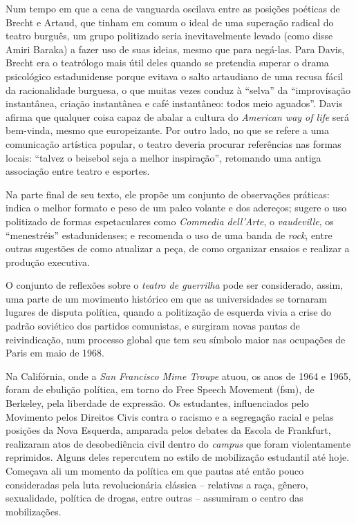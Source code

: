 Num tempo em que a cena de vanguarda oscilava entre as posições poéticas
de Brecht e Artaud, que tinham em comum o ideal de uma superação radical
do teatro burguês, um grupo politizado seria inevitavelmente levado
(como disse Amiri Baraka) a fazer uso de suas ideias, mesmo que para
negá-las. Para Davis, Brecht era o teatrólogo mais útil deles quando se
pretendia superar o drama psicológico estadunidense porque evitava o
salto artaudiano de uma recusa fácil da racionalidade burguesa, o que
muitas vezes conduz à “selva” da “improvisação instantânea, criação
instantânea e café instantâneo: todos meio aguados”. Davis afirma que
qualquer coisa capaz de abalar a cultura do {\it American way of life}
será bem-vinda, mesmo que europeizante. Por outro lado, no que se refere
a uma comunicação artística popular, o teatro deveria procurar
referências nas formas locais: “talvez o beisebol seja a melhor
inspiração”, retomando uma antiga associação entre teatro e esportes.

Na parte final de seu texto, ele propõe um conjunto de observações
práticas: indica o melhor formato e peso de um palco volante e dos
adereços; sugere o uso politizado de formas espetaculares como
{\it Commedia dell'Arte}, o {\it vaudeville}, os “menestréis”
estadunidenses; e recomenda o uso de uma banda de {\it rock}, entre
outras sugestões de como atualizar a peça, de como organizar ensaios e
realizar a produção executiva.

O conjunto de reflexões sobre o {\it teatro de guerrilha} pode ser
considerado, assim, uma parte de um movimento histórico em que as
universidades se tornaram lugares de disputa política, quando a
politização de esquerda vivia a crise do padrão soviético dos partidos
comunistas, e surgiram novas pautas de reivindicação, num processo
global que tem seu símbolo maior nas ocupações de Paris em maio de 1968.

Na Califórnia, onde a {\it San Francisco Mime Troupe} atuou, os anos de
1964 e 1965, foram de ebulição política, em torno do Free Speech
Movement ({\sc fsm}), de Berkeley, pela liberdade de expressão. Os estudantes,
influenciados pelo Movimento pelos Direitos Civis contra o racismo e a
segregação racial e pelas posições da Nova Esquerda, amparada pelos
debates da Escola de Frankfurt, realizaram atos de desobediência civil
dentro do {\it campus} que foram violentamente reprimidos. Alguns deles
repercutem no estilo de mobilização estudantil até hoje. Começava ali um
momento da política em que pautas até então pouco consideradas pela luta
revolucionária clássica -- relativas a raça, gênero, sexualidade,
política de drogas, entre outras -- assumiram o centro das mobilizações.


